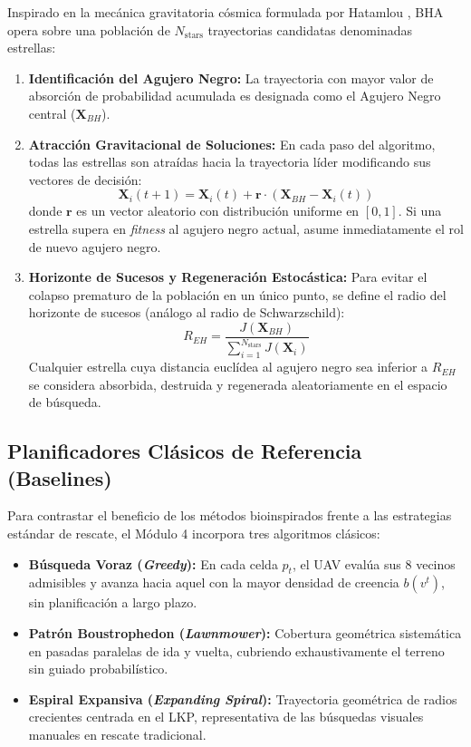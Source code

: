 Inspirado en la mecánica gravitatoria cósmica formulada por Hatamlou \cite{hatamlou2012}, BHA opera sobre una población de $N_{\text{stars}}$ trayectorias candidatas denominadas estrellas:
\begin{enumerate}
    \item \textbf{Identificación del Agujero Negro:} La trayectoria con mayor valor de absorción de probabilidad acumulada es designada como el Agujero Negro central ($\mathbf{X}_{BH}$).
    \item \textbf{Atracción Gravitacional de Soluciones:} En cada paso del algoritmo, todas las estrellas son atraídas hacia la trayectoria líder modificando sus vectores de decisión:
    \begin{equation}
    \mathbf{X}_i(t+1) = \mathbf{X}_i(t) + \mathbf{r} \cdot \left( \mathbf{X}_{BH} - \mathbf{X}_i(t) \right)
    \end{equation}
    donde $\mathbf{r}$ es un vector aleatorio con distribución uniforme en $[0, 1]$. Si una estrella supera en \textit{fitness} al agujero negro actual, asume inmediatamente el rol de nuevo agujero negro.
    \item \textbf{Horizonte de Sucesos y Regeneración Estocástica:} Para evitar el colapso prematuro de la población en un único punto, se define el radio del horizonte de sucesos (análogo al radio de Schwarzschild):
    \begin{equation}
    R_{EH} = \frac{J(\mathbf{X}_{BH})}{\sum_{i=1}^{N_{\text{stars}}} J(\mathbf{X}_i)}
    \end{equation}
    Cualquier estrella cuya distancia euclídea al agujero negro sea inferior a $R_{EH}$ se considera absorbida, destruida y regenerada aleatoriamente en el espacio de búsqueda.
\end{enumerate}

\subsection{Planificadores Clásicos de Referencia (Baselines)}

Para contrastar el beneficio de los métodos bioinspirados frente a las estrategias estándar de rescate, el Módulo 4 incorpora tres algoritmos clásicos:
\begin{itemize}
    \item \textbf{Búsqueda Voraz (\textit{Greedy}):} En cada celda $p_t$, el UAV evalúa sus 8 vecinos admisibles y avanza hacia aquel con la mayor densidad de creencia $b(v^t)$, sin planificación a largo plazo.
    \item \textbf{Patrón Boustrophedon (\textit{Lawnmower}):} Cobertura geométrica sistemática en pasadas paralelas de ida y vuelta, cubriendo exhaustivamente el terreno sin guiado probabilístico.
    \item \textbf{Espiral Expansiva (\textit{Expanding Spiral}):} Trayectoria geométrica de radios crecientes centrada en el LKP, representativa de las búsquedas visuales manuales en rescate tradicional.
\end{itemize}

